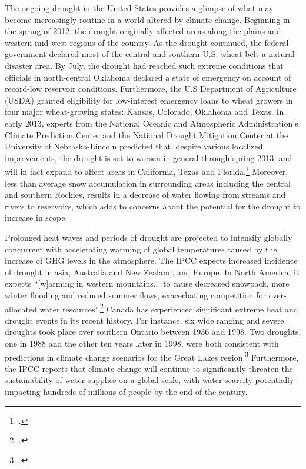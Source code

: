 The ongoing drought in the United States provides a glimpse of what may become increasingly routine in a world altered by climate change.
Beginning in the spring of 2012, the drought originally affected areas along the plains and western mid-west regions of the country. 
As the drought continued, the federal government declared most of the central and southern U.S. wheat belt a natural disaster area. 
By July, the drought had reached such extreme conditions that officials in north-central Oklahoma declared a state of emergency on account of record-low reservoir conditions. 
Furthermore, the U.S Department of Agriculture (USDA) granted eligibility for low-interest emergency loans to wheat growers in four major wheat-growing states: Kansas, Colorado, Oklahoma and Texas. 
In early 2013, experts from the National Oceanic and Atmospheric Administration's Climate Prediction Center and the National Drought Mitigation Center at the University of Nebraska-Lincoln predicted that, despite various localized improvements, the drought is set to worsen in general through spring 2013, and will in fact expand to affect areas in California, Texas and Florida.\footcite[][]{NOAAteleconf2013}
Moreover, less than average snow accumulation in surrounding areas including the central and southern Rockies, results in a decrease of water flowing from streams and rivers to reservoirs, which adds to concerns about the potential for the drought to increase in scope.



Prolonged heat waves and periods of drought are projected to intensify globally concurrent with accelerating warming of global temperatures caused by the increase of GHG levels in the atmosphere.
The IPCC expects increased incidence of drought in asia, Australia and New Zealand, and Europe.
In North America, it expects ``[w]arming in western mountains... to cause decreased snowpack, more winter flooding and reduced summer flows, exacerbating competition for over-allocated water resources''.\footcite[][See: Synthesis report, Table SPM.2. Examples of some projected regional impacts. \url{https://www.ipcc.ch/publications_and_data/ar4/syr/en/spms3.html}]{IPCC2007}
Canada has experienced significant extreme heat and drought events in its recent history. 
For instance, six wide ranging and severe droughts took place over southern Ontario between 1936 and 1998. 
Two droughts, one in 1988 and the other ten years later in 1998, were both consistent with predictions in climate change scenarios for the Great Lakes region.\footcite[][]{Koshida2005}
Furthermore, the IPCC reports that climate change will continue to significantly threaten the sustainability of water supplies on a global scale, with water scarcity potentially impacting hundreds of millions of people by the end of the century.

